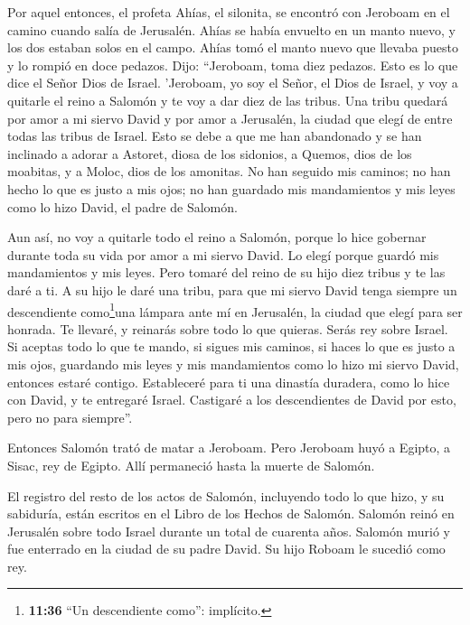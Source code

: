  Por aquel entonces, el profeta Ahías, el silonita, se
encontró con Jeroboam en el camino cuando salía de Jerusalén.
 Ahías se había envuelto en un manto nuevo, y los dos
estaban solos en el campo. Ahías tomó el manto nuevo que llevaba puesto
y lo rompió en doce pedazos.  Dijo: ``Jeroboam, toma diez
pedazos. Esto es lo que dice el Señor Dios de Israel. 'Jeroboam, yo soy
el Señor, el Dios de Israel, y voy a quitarle el reino a Salomón y te
voy a dar diez de las tribus.  Una tribu quedará por amor a
mi siervo David y por amor a Jerusalén, la ciudad que elegí de entre
todas las tribus de Israel.  Esto se debe a que me han
abandonado y se han inclinado a adorar a Astoret, diosa de los sidonios,
a Quemos, dios de los moabitas, y a Moloc, dios de los amonitas. No han
seguido mis caminos; no han hecho lo que es justo a mis ojos; no han
guardado mis mandamientos y mis leyes como lo hizo David, el padre de
Salomón.

 Aun así, no voy a quitarle todo el reino a Salomón, porque
lo hice gobernar durante toda su vida por amor a mi siervo David. Lo
elegí porque guardó mis mandamientos y mis leyes.  Pero
tomaré del reino de su hijo diez tribus y te las daré a ti.
 A su hijo le daré una tribu, para que mi siervo David
tenga siempre un descendiente como\footnote{\textbf{11:36} ``Un
  descendiente como'': implícito.}una lámpara ante mí en Jerusalén, la
ciudad que elegí para ser honrada.  Te llevaré, y reinarás
sobre todo lo que quieras. Serás rey sobre Israel.  Si
aceptas todo lo que te mando, si sigues mis caminos, si haces lo que es
justo a mis ojos, guardando mis leyes y mis mandamientos como lo hizo mi
siervo David, entonces estaré contigo. Estableceré para ti una dinastía
duradera, como lo hice con David, y te entregaré Israel. 
Castigaré a los descendientes de David por esto, pero no para siempre''.

 Entonces Salomón trató de matar a Jeroboam. Pero Jeroboam
huyó a Egipto, a Sisac, rey de Egipto. Allí permaneció hasta la muerte
de Salomón.

 El registro del resto de los actos de Salomón, incluyendo
todo lo que hizo, y su sabiduría, están escritos en el Libro de los
Hechos de Salomón.  Salomón reinó en Jerusalén sobre todo
Israel durante un total de cuarenta años.  Salomón murió y
fue enterrado en la ciudad de su padre David. Su hijo Roboam le sucedió
como rey.


